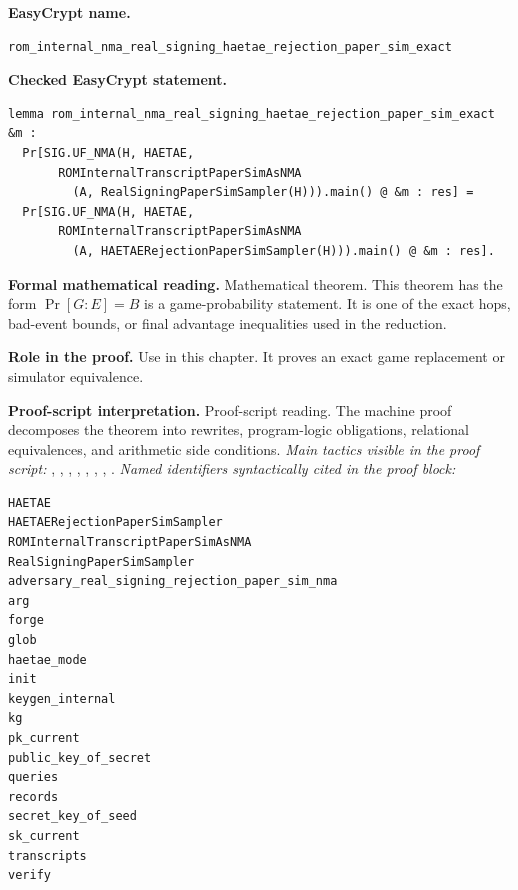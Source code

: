 \begin{formaltheorem}
\noindent\textbf{EasyCrypt name.}
\begin{lstlisting}[language=EasyCrypt,basicstyle=\ttfamily\scriptsize]
rom_internal_nma_real_signing_haetae_rejection_paper_sim_exact
\end{lstlisting}
\noindent\textbf{Checked EasyCrypt statement.}
\begin{lstlisting}[language=EasyCrypt,basicstyle=\ttfamily\scriptsize]
lemma rom_internal_nma_real_signing_haetae_rejection_paper_sim_exact &m :
  Pr[SIG.UF_NMA(H, HAETAE,
       ROMInternalTranscriptPaperSimAsNMA
         (A, RealSigningPaperSimSampler(H))).main() @ &m : res] =
  Pr[SIG.UF_NMA(H, HAETAE,
       ROMInternalTranscriptPaperSimAsNMA
         (A, HAETAERejectionPaperSimSampler(H))).main() @ &m : res].
\end{lstlisting}
\noindent\textbf{Formal mathematical reading.}
Mathematical theorem. This theorem has the form \(\Pr[G:E] = B\) is a game-probability statement.  It is one of the exact hops, bad-event bounds, or final advantage inequalities used in the reduction.

\noindent\textbf{Role in the proof.}
Use in this chapter. It proves an exact game replacement or simulator equivalence.

\noindent\textbf{Proof-script interpretation.}
Proof-script reading. The machine proof decomposes the theorem into rewrites, program-logic obligations, relational equivalences, and arithmetic side conditions.
\emph{Main tactics visible in the proof script:} , , , , , , , .
\emph{Named identifiers syntactically cited in the proof block:}
\begin{lstlisting}[language=EasyCrypt,basicstyle=\ttfamily\scriptsize]
HAETAE
HAETAERejectionPaperSimSampler
ROMInternalTranscriptPaperSimAsNMA
RealSigningPaperSimSampler
adversary_real_signing_rejection_paper_sim_nma
arg
forge
glob
haetae_mode
init
keygen_internal
kg
pk_current
public_key_of_secret
queries
records
secret_key_of_seed
sk_current
transcripts
verify
\end{lstlisting}

\end{formaltheorem}

